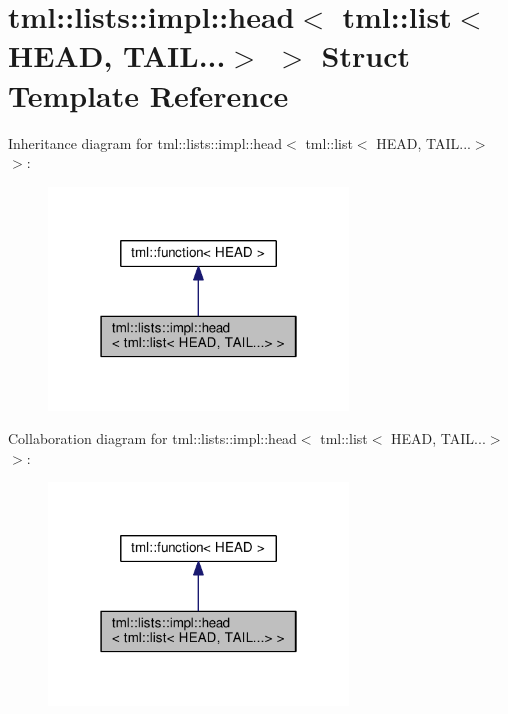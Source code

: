 \hypertarget{structtml_1_1lists_1_1impl_1_1head_3_01tml_1_1list_3_01_h_e_a_d_00_01_t_a_i_l_8_8_8_4_01_4}{\section{tml\+:\+:lists\+:\+:impl\+:\+:head$<$ tml\+:\+:list$<$ H\+E\+A\+D, T\+A\+I\+L...$>$ $>$ Struct Template Reference}
\label{structtml_1_1lists_1_1impl_1_1head_3_01tml_1_1list_3_01_h_e_a_d_00_01_t_a_i_l_8_8_8_4_01_4}
}


Inheritance diagram for tml\+:\+:lists\+:\+:impl\+:\+:head$<$ tml\+:\+:list$<$ H\+E\+A\+D, T\+A\+I\+L...$>$ $>$\+:
\nopagebreak
\begin{figure}[H]
\begin{center}
\leavevmode
\includegraphics[width=226pt]{structtml_1_1lists_1_1impl_1_1head_3_01tml_1_1list_3_01_h_e_a_d_00_01_t_a_i_l_8_8_8_4_01_4__inherit__graph}
\end{center}
\end{figure}


Collaboration diagram for tml\+:\+:lists\+:\+:impl\+:\+:head$<$ tml\+:\+:list$<$ H\+E\+A\+D, T\+A\+I\+L...$>$ $>$\+:
\nopagebreak
\begin{figure}[H]
\begin{center}
\leavevmode
\includegraphics[width=226pt]{structtml_1_1lists_1_1impl_1_1head_3_01tml_1_1list_3_01_h_e_a_d_00_01_t_a_i_l_8_8_8_4_01_4__coll__graph}
\end{center}
\end{figure}
